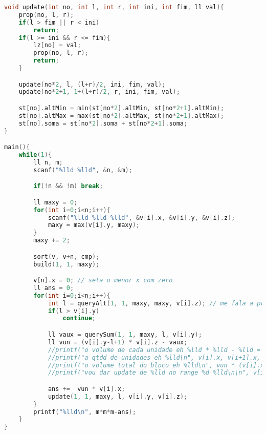 \documentclass[12pt,a4paper, twoside]{report}
\begin{document}
\begin{lstlisting}[caption=União do volume das caixas,language=C++]
void update(int no, int l, int r, int ini, int fim, ll val){
    prop(no, l, r);
    if(l > fim || r < ini)
        return;
    if(l >= ini && r <= fim){
        lz[no] = val;
        prop(no, l, r);
        return;
    }

    update(no*2, l, (l+r)/2, ini, fim, val);
    update(no*2+1, 1+(l+r)/2, r, ini, fim, val);

    st[no].altMin = min(st[no*2].altMin, st[no*2+1].altMin);
    st[no].altMax = max(st[no*2].altMax, st[no*2+1].altMax);
    st[no].soma = st[no*2].soma + st[no*2+1].soma;
}

main(){
    while(1){
        ll n, m;
        scanf("%lld %lld", &n, &m);

        if(!n && !m) break;

        ll maxy = 0;
        for(int i=0;i<n;i++){
            scanf("%lld %lld %lld", &v[i].x, &v[i].y, &v[i].z);
            maxy = max(v[i].y, maxy);
        }
        maxy += 2;

        sort(v, v+n, cmp);
        build(1, 1, maxy);

        v[n].x = 0; // seta o menor x com zero
        ll ans = 0;
        for(int i=0;i<n;i++){
            int l = queryAlt(1, 1, maxy, maxy, v[i].z); // me fala a primeira posicao q eh "mais baixa q eu"
            if(l > v[i].y)
                continue;

            ll vaux = querySum(1, 1, maxy, l, v[i].y);
            ll vun = (v[i].y-l+1) * v[i].z - vaux;
            //printf("o volume de cada unidade eh %lld * %lld - %lld = %lld\n", v[i].y-l+1, v[i].z, vaux, vun);
            //printf("a qtdd de unidades eh %lld\n", v[i].x, v[i+1].x, v[i].x-v[i+1].x);
            //printf("o volume total do bloco eh %lld\n", vun * (v[i].x));
            //printf("vou dar update de %lld no range %d %lld\n\n", v[i].z, l, v[i].y);

            ans +=  vun * v[i].x;
            update(1, 1, maxy, l, v[i].y, v[i].z);
        }
        printf("%lld\n", m*m*m-ans);
    }
}
\end{lstlisting}
\end{document}
